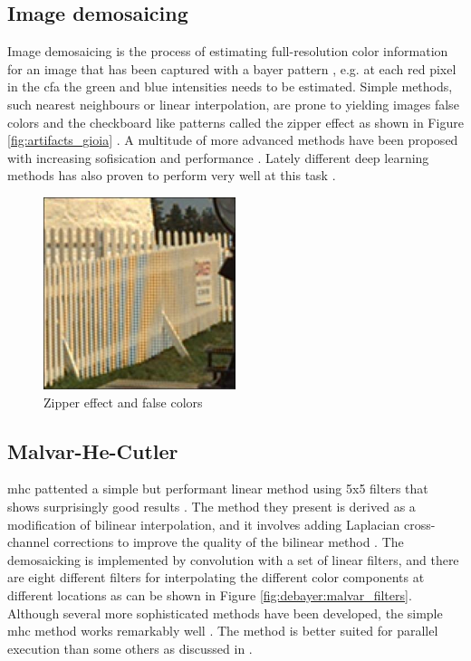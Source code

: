 \subsection{Image demosaicing}
Image demosaicing is the process of estimating full-resolution color information for an image that has been captured with a bayer pattern \cite{liImageDemosaicingSystematic2008}, e.g. at each red pixel in the \gls{cfa} the green and blue intensities needs to be estimated.
Simple methods, such nearest neighbours or linear interpolation, are prone to yielding images false colors and the checkboard like patterns called the zipper effect as shown in Figure \ref{fig:artifacts_gioia} \cite{gioiaDataDrivenConvolutionalModel2021} \cite{liImageDemosaicingSystematic2008}.
A multitude of more advanced methods have been proposed with increasing sofisication and performance \cite{liImageDemosaicingSystematic2008}.
Lately different deep learning methods has also proven to perform very well at this task \cite{kwanComparisonDeepLearning2019}.

\begin{figure}[H]
    \centering
    \includegraphics[width=0.5\textwidth]{figures/debayer/artifacts_gioia.png}
    \caption{Zipper effect and false colors \cite{gioiaDataDrivenConvolutionalModel2021}}
    \label{fig:artifacts_gioioa}
\end{figure}

\subsection{Malvar-He-Cutler}
\gls{mhc} pattented a simple but performant linear method using 5x5 filters that shows surprisingly good results \cite{malvarHighqualityGradientcorrectedLinear2009}.
The method they present is derived as a modification of bilinear interpolation, and it involves adding Laplacian cross-channel corrections to improve the quality of the bilinear method \cite{getreuerMalvarHeCutlerLinearImage2011}.
The demosaicking is implemented by convolution with a set of linear filters, and there are eight different filters for interpolating the different color components at different locations as can be shown in Figure \ref{fig:debayer:malvar_filters}.
Although several more sophisticated methods have been developed, the simple \gls{mhc} method works remarkably well \cite{liImageDemosaicingSystematic2008}\cite{kwanComparisonDeepLearning2019}\cite{getreuerMalvarHeCutlerLinearImage2011}.
The method is better suited for parallel execution than some others as discussed in \todo.



